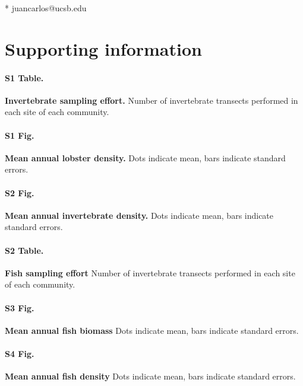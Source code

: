 \documentclass[10pt]{article}
\begin{document}

* juancarlos@ucsb.edu

\section*{Supporting information}

\paragraph*{S1 Table.}

\label{S1_Table}
{\bf Invertebrate sampling effort.} Number of invertebrate transects performed in each site of each community.

\paragraph*{S1 Fig.}
\label{S1_Fig}
{\bf Mean annual lobster density.} Dots indicate mean, bars indicate standard errors.

\paragraph*{S2 Fig.}
\label{S2_Fig}
{\bf Mean annual invertebrate density.} Dots indicate mean, bars indicate standard errors.

\paragraph*{S2 Table.}

\label{S2_Table}
{\bf Fish sampling effort} Number of invertebrate transects performed in each site of each community.

\paragraph*{S3 Fig.}
\label{S3_Fig}
{\bf Mean annual fish biomass} Dots indicate mean, bars indicate standard errors.

\paragraph*{S4 Fig.}
\label{S4_Fig}
{\bf Mean annual fish density} Dots indicate mean, bars indicate standard errors.
\end{document}

